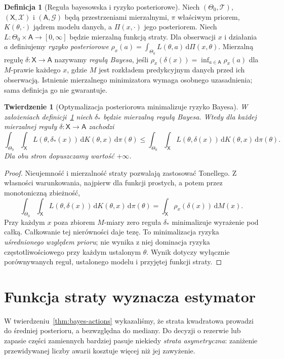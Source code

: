 \documentclass[11pt,a4paper,oneside]{report}
\numberwithin{equation}{chapter}
\theoremstyle{plain}
\newtheorem{twierdzenie}{Twierdzenie}[chapter]
\theoremstyle{definition}
\newtheorem{definicja}{Definicja}[chapter]
\theoremstyle{remark}
\newcommand{\dd}{\mathrm d}
\begin{document}
\begin{definicja}[Reguła bayesowska i ryzyko posteriorowe]
\label{def:bayes-rule-ch19}
Niech $(\Theta_0,\mathcal T)$, $(\mathsf X,\mathcal X)$ i
$(\mathsf A,\mathcal G)$ będą przestrzeniami mierzalnymi,
$\pi$ właściwym priorem, $K(\theta,\cdot)$ jądrem modelu danych,
a $\Pi(x,\cdot)$ jego posteriorem. Niech
$L:\Theta_0\times\mathsf A\to[0,\infty]$ będzie mierzalną
funkcją straty. Dla obserwacji $x$ i działania $a$ definiujemy
\emph{ryzyko posteriorowe}
$\rho_x(a)=\int_{\Theta_0}L(\theta,a)\,\dd\Pi(x,\theta)$.
Mierzalną regułę $\delta:\mathsf X\to\mathsf A$ nazywamy
\emph{regułą Bayesa}, jeśli $\rho_x(\delta(x))=\inf_{a\in\mathsf A}\rho_x(a)$
dla $M$-prawie każdego $x$, gdzie $M$ jest rozkładem
predykcyjnym danych przed ich obserwacją. Istnienie mierzalnego
minimizatora wymaga osobnego uzasadnienia; sama definicja go
nie gwarantuje.
\end{definicja}

\begin{twierdzenie}[Optymalizacja posteriorowa minimalizuje ryzyko Bayesa]
\label{thm:bayes-risk-tower}
W założeniach definicji~\ref{def:bayes-rule-ch19} niech
$\delta_*$ będzie mierzalną regułą Bayesa. Wtedy dla każdej
mierzalnej reguły $\delta:\mathsf X\to\mathsf A$ zachodzi
\[
\int_{\Theta_0}\int_{\mathsf X}
 L(\theta,\delta_*(x))\,\dd K(\theta,x)\,\dd\pi(\theta)
\le
\int_{\Theta_0}\int_{\mathsf X}
 L(\theta,\delta(x))\,\dd K(\theta,x)\,\dd\pi(\theta).
\]
Dla obu stron dopuszczamy wartość $+\infty$.
\end{twierdzenie}
\begin{proof}
Nieujemność i mierzalność straty pozwalają zastosować Tonellego.
Z własności warunkowania, najpierw dla funkcji prostych, a potem
przez monotoniczną zbieżność,
\[
\int_{\Theta_0}\int_{\mathsf X}L(\theta,\delta(x))
\,\dd K(\theta,x)\,\dd\pi(\theta)
=\int_{\mathsf X}\rho_x(\delta(x))\,\dd M(x).
\]
Przy każdym $x$ poza zbiorem $M$-miary zero reguła $\delta_*$
minimalizuje wyrażenie pod całką. Całkowanie tej nierówności
daje tezę. To minimalizacja ryzyka \emph{uśrednionego względem
prioru}; nie wynika z niej dominacja ryzyka częstotliwościowego
przy każdym ustalonym $\theta$. Wynik dotyczy wyłącznie
porównywanych reguł, ustalonego modelu i przyjętej funkcji straty.
\end{proof}

\section{Funkcja straty wyznacza estymator}
W twierdzeniu~\ref{thm:bayes-actions} wykazaliśmy, że strata
kwadratowa prowadzi do średniej posterioru, a bezwzględna do
mediany. Do decyzji o rezerwie lub zapasie części zamiennych
bardziej pasuje niekiedy \emph{strata asymetryczna}: zaniżenie
przewidywanej liczby awarii kosztuje więcej niż jej zawyżenie.
\end{document}
